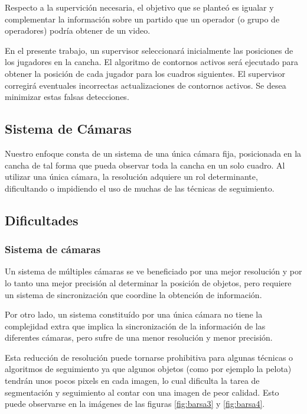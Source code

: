 \documentclass[a4paper,10pt]{article}
\begin{document}


Respecto a la supervición necesaria, el objetivo que se planteó es igualar y
complementar la información sobre un partido que un operador (o grupo de
operadores) podría obtener de un video.

En el presente trabajo, un supervisor seleccionará inicialmente las posiciones
de los jugadores en la cancha. El algoritmo de contornos activos será
ejecutado para obtener la posición de cada jugador para los cuadros siguientes.
El supervisor corregirá eventuales incorrectas actualizaciones de contornos
activos. Se desea minimizar estas falsas detecciones.

\subsection{Sistema de Cámaras}

Nuestro enfoque consta de un sistema de una única cámara fija, posicionada en
la cancha de tal forma que pueda observar toda la cancha en un solo cuadro. Al
utilizar una única cámara, la resolución adquiere un rol determinante,
dificultando o impidiendo el uso de muchas de las técnicas de seguimiento.

\subsection{Dificultades}

\subsubsection{Sistema de cámaras}

Un sistema de múltiples cámaras se ve beneficiado por una mejor resolución y
por lo tanto una mejor precisión al determinar la posición de objetos, pero
requiere un sistema de sincronización que coordine la obtención de información.

Por otro lado, un sistema constituído por una única cámara no tiene la
complejidad extra que implica la sincronización de la información de las
diferentes cámaras, pero sufre de una menor resolución y menor precisión.

Esta reducción de resolución puede tornarse prohibitiva para algunas técnicas o
algoritmos de seguimiento ya que algunos objetos (como por ejemplo la pelota)
tendrán unos pocos pixels en cada imagen, lo cual dificulta la tarea de
segmentación y seguimiento al contar con una imagen de peor calidad.  Esto
puede observarse en la imágenes de las figuras \ref{fig:barsa3} y
\ref{fig:barsa4}.
\end{document}
